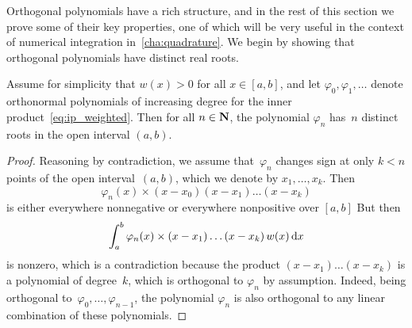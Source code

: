Orthogonal polynomials have a rich structure,
and in the rest of this section we prove some of their key properties,
one of which will be very useful in the context of numerical integration in~\cref{cha:quadrature}.
We begin by showing that
orthogonal polynomials have distinct real roots.
\begin{proposition}
    \label{proposition:distinct_roots}
    Assume for simplicity that $w(x) > 0$ for all $x \in [a, b]$,
    and let $\varphi_0, \varphi_1, \dotsc$ denote orthonormal polynomials of increasing degree for the inner product~\eqref{eq:ip_weighted}.
    Then for all $n \in \mathbf N$,
    the polynomial $\varphi_n$ has~$n$ distinct roots in the open interval $(a, b)$.
\end{proposition}
\begin{proof}
    Reasoning by contradiction,
    we assume that~$\varphi_n$ changes sign at only $k < n$ points of the open interval~$(a, b)$,
    which we denote by $x_1, \dotsc, x_k$.
    Then
    \[
        \varphi_n(x) \times (x - x_0) (x - x_1) \dotsc (x - x_k)
    \]
    is either everywhere nonnegative or everywhere nonpositive over $[a, b]$
    But then
    \[
        \int_{a}^{b} \varphi_n(x) \times (x - x_1)  \dotsc (x - x_k) \, w(x) \, \mathrm d x
    \]
    is nonzero,
    which is a contradiction because the product $(x-x_1) \dotsc (x-x_k)$ is a polynomial of degree~$k$,
    which is orthogonal to $\varphi_n$ by assumption.
    Indeed, being orthogonal to~$\varphi_0, \dotsc, \varphi_{n-1}$,
    the polynomial $\varphi_n$ is also orthogonal to any linear combination of these polynomials.
\end{proof}

